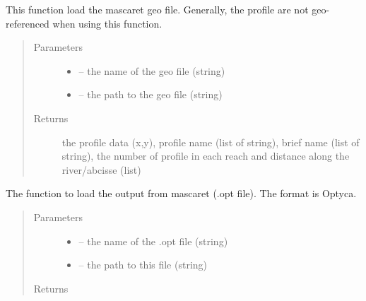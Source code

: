 \documentclass[letterpaper,10pt,english]{sphinxmanual}
\begin{document}

\begin{fulllineitems}
\label{\detokenize{index:src.mascaret.open_geo_mascaret}}
This function load the mascaret geo file. Generally, the profile are not geo-referenced when using this function.
\begin{quote}\begin{description}
\item[{Parameters}] \leavevmode\begin{itemize}
\item {} 
 -- the name of the geo file (string)

\item {} 
 -- the path to the geo file (string)

\end{itemize}

\item[{Returns}] \leavevmode
the profile data (x,y), profile name (list of string),
brief name (list of string), the number of profile in each reach and distance along the river/abcisse (list)

\end{description}\end{quote}

\end{fulllineitems}


\begin{fulllineitems}
\label{\detokenize{index:src.mascaret.open_res_file}}
The function to load the output from mascaret (.opt file). The format is Optyca.
\begin{quote}\begin{description}
\item[{Parameters}] \leavevmode\begin{itemize}
\item {} 
 -- the name of the .opt file (string)

\item {} 
 -- the path to this file (string)

\end{itemize}

\item[{Returns}] \leavevmode


\end{description}\end{quote}

\end{fulllineitems}
\end{document}
